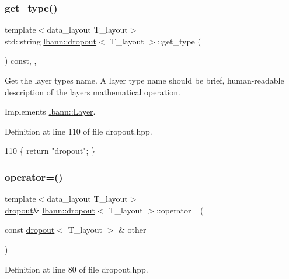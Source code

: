 \subsubsection{\texorpdfstring{get\+\_\+type()}{get\_type()}}
{\footnotesize\ttfamily template$<$data\+\_\+layout T\+\_\+layout$>$ \\
std\+::string \hyperlink{classlbann_1_1dropout}{lbann\+::dropout}$<$ T\+\_\+layout $>$\+::get\+\_\+type (\begin{DoxyParamCaption}{ }\end{DoxyParamCaption}) const\hspace{0.3cm}{\ttfamily [inline]}, {\ttfamily [override]}, {\ttfamily [virtual]}}

Get the layer type\textquotesingle{}s name. A layer type name should be brief, human-\/readable description of the layer\textquotesingle{}s mathematical operation. 

Implements \hyperlink{classlbann_1_1Layer_a0fa0ea9160b490c151c0a17fde4f7239}{lbann\+::\+Layer}.



Definition at line 110 of file dropout.\+hpp.


\begin{DoxyCode}
110 \{ \textcolor{keywordflow}{return} \textcolor{stringliteral}{"dropout"}; \}
\end{DoxyCode}
\mbox{\label{classlbann_1_1dropout_a0243b0bc3c2a4239a5ba6d64e6566a15}} 
\subsubsection{\texorpdfstring{operator=()}{operator=()}}
{\footnotesize\ttfamily template$<$data\+\_\+layout T\+\_\+layout$>$ \\
\hyperlink{classlbann_1_1dropout}{dropout}\& \hyperlink{classlbann_1_1dropout}{lbann\+::dropout}$<$ T\+\_\+layout $>$\+::operator= (\begin{DoxyParamCaption}\item[{const \hyperlink{classlbann_1_1dropout}{dropout}$<$ T\+\_\+layout $>$ \&}]{other }\end{DoxyParamCaption})\hspace{0.3cm}{\ttfamily [inline]}}



Definition at line 80 of file dropout.\+hpp.


